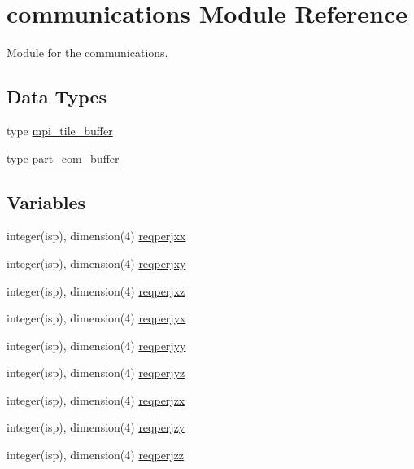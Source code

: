 \hypertarget{namespacecommunications}{}\section{communications Module Reference}
\label{namespacecommunications}


Module for the communications.  


\subsection*{Data Types}
\begin{DoxyCompactItemize}
\item 
type \hyperlink{structcommunications_1_1mpi__tile__buffer}{mpi\+\_\+tile\+\_\+buffer}
\item 
type \hyperlink{structcommunications_1_1part__com__buffer}{part\+\_\+com\+\_\+buffer}
\end{DoxyCompactItemize}
\subsection*{Variables}
\begin{DoxyCompactItemize}
\item 
integer(isp), dimension(4) \hyperlink{namespacecommunications_ab09f2571f6d9283fbc47609b3e6de32a}{reqperjxx}
\item 
integer(isp), dimension(4) \hyperlink{namespacecommunications_a579ce4f6ca8641ffb00fd802371714c3}{reqperjxy}
\item 
integer(isp), dimension(4) \hyperlink{namespacecommunications_afa5731d4931bff540f2d1e62849afb6c}{reqperjxz}
\item 
integer(isp), dimension(4) \hyperlink{namespacecommunications_a44e505738aca0afddea17f1b8800be28}{reqperjyx}
\item 
integer(isp), dimension(4) \hyperlink{namespacecommunications_afc48247f3f83606f2b7c1e498621fcd5}{reqperjyy}
\item 
integer(isp), dimension(4) \hyperlink{namespacecommunications_ae4760ee5787c5b5981856095495ea82d}{reqperjyz}
\item 
integer(isp), dimension(4) \hyperlink{namespacecommunications_a9a0f53e00bdcaa044856f745008de045}{reqperjzx}
\item 
integer(isp), dimension(4) \hyperlink{namespacecommunications_a76e287cb90a1968309c7e2370420748c}{reqperjzy}
\item 
integer(isp), dimension(4) \hyperlink{namespacecommunications_af38ed57408b60ed5170d54b350aa1b32}{reqperjzz}
\end{DoxyCompactItemize}


